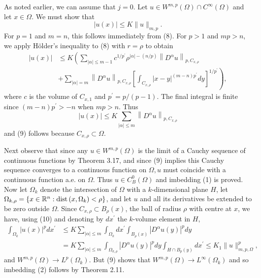 \begin{para}
  As noted earlier, we can assume that $j=0$. Let $u \in W^{m,p}(\Omega) \cap C^{\infty}(\Omega)$ 
  and let $x \in \Omega$. We must show that
  \[
  |u(x)| \leq K\|u\|_{m,p} .
  \]
  For $p=1$ and $m=n$, this follows immediately from (8). For $p>1$ and $m p>n$,
  we apply Hölder's inequality to (8) with $r=\rho$ to obtain
  \[
  \begin{aligned}
  |u(x)| & \leq K\left(\sum_{|\alpha| \leq m-1} c^{1 / p^{\prime}} \rho^{|\alpha|-(n / p)}\left\|D^\alpha u\right\|_{p, C_{x, \rho}}\right. \\
  & \left.+\sum_{|\alpha|=m}\left\|D^\alpha u\right\|_{p, C_{x, \rho}}\left[\int_{C_{x, \rho}}|x-y|^{(m-n) p^{\prime}} d y\right]^{1 / p^{\prime}}\right),
  \end{aligned}
  \]
  where $c$ is the volume of $C_{x, 1}$ and $p^{\prime}=p /(p-1)$. The final integral is finite since $(m-n) p^{\prime}>-n$ when $m p>n$. Thus
  \[
  |u(x)| \leq K \sum_{|\alpha| \leq m}\left\|D^\alpha u\right\|_{p, C_{x, \rho}}
  \]
  and (9) follows because $C_{x, \rho} \subset \Omega$.
  
  Next observe that since any $u \in W^{m,p}(\Omega)$ is the limit of a Cauchy sequence of continuous functions 
  by Theorem 3.17, and since (9) implies this Cauchy sequence converges to a continuous function on $\Omega, u$ 
  must coincide with a continuous function a.e. on $\Omega$. Thus $u \in C_B^0(\Omega)$ and imbedding (1) is 
  proved.
  Now let $\Omega_k$ denote the intersection of $\Omega$ with a $k$-dimensional plane $H$,
  let $\Omega_{k, \rho}=\left\{x \in \mathbb{R}^n: \operatorname{dist}\left(x, \Omega_k\right)<\rho\right\}$, 
  and let $u$ and all its derivatives be extended to be zero outside $\Omega$.
  Since $C_{x, \rho} \subset B_\rho(x)$, the ball of radius $\rho$ with centre at $x$,
  we have, using (10) and denoting by $d x^{\prime}$ the $k$-volume element in $H$,
  \[
  \begin{aligned}
  \int_{\Omega_k}|u(x)|^p d x^{\prime} & \leq K \sum_{|\alpha| \leq m} \int_{\Omega_k} d x^{\prime} \int_{B_\rho(x)}\left|D^\alpha u(y)\right|^p d y \\
  & =K \sum_{|\alpha| \leq m} \int_{\Omega_{k, \rho}}\left|D^\alpha u(y)\right|^p d y \int_{H \cap B_p(y)} d x^{\prime} \leq K_1\|u\|_{m, p, \Omega}^p,
  \end{aligned}
  \]
  and $W^{m,p}(\Omega) \rightarrow L^p(\Omega_k)$. But (9) shows that $W^{m,p}(\Omega) \rightarrow L^{\infty}(\Omega_k)$ and so imbedding (2) follows by Theorem 2.11.
\end{para}

